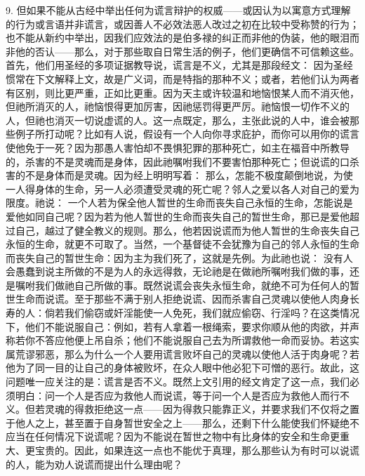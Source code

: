 9. 但如果不能从古经中举出任何为谎言辩护的权威——或因认为以寓意方式理解的行为或言语并非谎言，或因善人不必效法恶人改过之初在比较中受称赞的行为；也不能从新约中举出，因我们应效法的是伯多禄的纠正而非他的伪装，他的眼泪而非他的否认——那么，对于那些取自日常生活的例子，他们更确信不可信赖这些。首先，他们用圣经的多项证据教导说，谎言是不义，尤其是那段经文： 因为圣经惯常在下文解释上文，故是广义词，而是特指的那种不义；或者，若他们认为两者有区别，则比更严重，正如比更重。因为天主或许较温和地恼恨某人而不消灭他，但祂所消灭的人，祂恼恨得更加厉害，因祂惩罚得更严厉。祂恼恨一切作不义的人，但祂也消灭一切说虚谎的人。这一点既定，那么，主张此说的人中，谁会被那些例子所打动呢？比如有人说，假设有一个人向你寻求庇护，而你可以用你的谎言使他免于一死？因为那愚人害怕却不畏惧犯罪的那种死亡，如主在福音中所教导的，杀害的不是灵魂而是身体，因此祂嘱咐我们不要害怕那种死亡；但说谎的口杀害的不是身体而是灵魂。因为经上明明写着： 那么，怎能不极度颠倒地说，为使一人得身体的生命，另一人必须遭受灵魂的死亡呢？邻人之爱以各人对自己的爱为限度。祂说： 一个人若为保全他人暂世的生命而丧失自己永恒的生命，怎能说是爱他如同自己呢？因为若为他人暂世的生命而丧失自己的暂世生命，那已是爱他超过自己，越过了健全教义的规则。那么，他若因说谎而为他人暂世的生命丧失自己永恒的生命，就更不可取了。当然，一个基督徒不会犹豫为自己的邻人永恒的生命而丧失自己的暂世生命：因为主为我们死了，这就是先例。为此祂也说： 没有人会愚蠢到说主所做的不是为人的永远得救，无论祂是在做祂所嘱咐我们做的事，还是嘱咐我们做祂自己所做的事。既然说谎会丧失永恒生命，就绝不可为任何人的暂世生命而说谎。至于那些不满于别人拒绝说谎、因而杀害自己灵魂以使他人肉身长寿的人：倘若我们偷窃或奸淫能使一人免死，我们就应偷窃、行淫吗？在这类情况下，他们不能说服自己：例如，若有人拿着一根绳索，要求你顺从他的肉欲，并声称若你不答应他便上吊自杀；他们不能说服自己去为所谓救他一命而妥协。若这实属荒谬邪恶，那么为什么一个人要用谎言败坏自己的灵魂以使他人活于肉身呢？若他为了同一目的让自己的身体被败坏，在众人眼中他必犯下可憎的恶行。故此，这问题唯一应关注的是：谎言是否不义。既然上文引用的经文肯定了这一点，我们必须明白：问一个人是否应为救他人而说谎，等于问一个人是否应为救他人而行不义。但若灵魂的得救拒绝这一点——因为得救只能靠正义，并要求我们不仅将之置于他人之上，甚至置于自身暂世安全之上——那么，还剩下什么能使我们怀疑绝不应当在任何情况下说谎呢？因为不能说在暂世之物中有比身体的安全和生命更重大、更宝贵的。因此，如果连这一点也不能优于真理，那么那些认为有时可以说谎的人，能为劝人说谎而提出什么理由呢？\par

